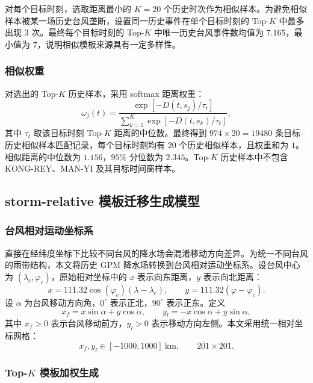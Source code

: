 \documentclass[UTF8,a4paper,zihao=5]{ctexart}
\numberwithin{equation}{section}
\numberwithin{figure}{section}
\numberwithin{table}{section}
\begin{document}
对每个目标时刻，选取距离最小的 $K=20$ 个历史时次作为相似样本。为避免相似样本被某一场历史台风垄断，设置同一历史事件在单个目标时刻的 Top-$K$ 中最多出现 $3$ 次。最终每个目标时刻的 Top-$K$ 中唯一历史台风事件数均值为 $7.165$，最小值为 $7$，说明相似模板来源具有一定多样性。

\subsubsection{相似权重}

对选出的 Top-$K$ 历史样本，采用 softmax 距离权重：
\begin{equation}
\omega_j(t)=
\frac{\exp[-D(t,s_j)/\tau_t]}
{\sum_{k=1}^{K}\exp[-D(t,s_k)/\tau_t]},
\end{equation}
其中 $\tau_t$ 取该目标时刻 Top-$K$ 距离的中位数。最终得到 $974\times 20=19480$ 条目标--历史相似样本匹配记录，每个目标时刻均有 $20$ 个历史相似样本，且权重和为 $1$。相似距离的中位数为 $1.156$，$95\%$ 分位数为 $2.345$。Top-$K$ 历史样本中不包含 KONG-REY、MAN-YI 及其目标时间窗样本。

\subsection{\texorpdfstring{storm-relative}{storm-relative} 模板迁移生成模型}

\subsubsection{台风相对运动坐标系}

直接在经纬度坐标下比较不同台风的降水场会混淆移动方向差异。为统一不同台风的雨带结构，本文将历史 GPM 降水场转换到台风相对运动坐标系。设台风中心为 $(\lambda_c,\varphi_c)$，原始相对坐标中的 $x$ 表示向东距离，$y$ 表示向北距离：
\begin{equation}
x=111.32\cos(\varphi_c)(\lambda-\lambda_c),\qquad
y=111.32(\varphi-\varphi_c).
\end{equation}
设 $\alpha$ 为台风移动方向角，$0^\circ$ 表示正北，$90^\circ$ 表示正东。定义
\begin{equation}
x_f=x\sin\alpha+y\cos\alpha,\qquad
y_l=-x\cos\alpha+y\sin\alpha,
\end{equation}
其中 $x_f>0$ 表示台风移动前方，$y_l>0$ 表示移动方向左侧。本文采用统一相对坐标网格：
\begin{equation}
x_f,y_l\in[-1000,1000]\ \mathrm{km},\qquad
201\times 201.
\end{equation}

\subsubsection{Top-$K$ 模板加权生成}
\end{document}
